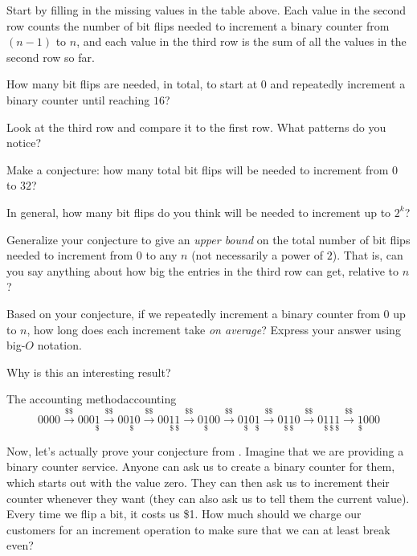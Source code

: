 \documentclass{tufte-handout}
\begin{document}
\begin{questions}
\item Start by filling in the missing values in the table above. Each
  value in the second row counts the number of bit flips needed to
  increment a binary counter from $(n-1)$ to $n$, and each value in
  the third row is the sum of all the values in the second row so far.
  \item How many bit flips are needed, in total, to start at $0$ and
    repeatedly increment a binary counter until reaching $16$?
  \item Look at the third row and compare it to the first row.  What
    patterns do you notice?
  \item Make a conjecture: how many total bit flips will be needed to
    increment from $0$ to $32$?
  \item In general, how many bit flips do you think will be needed to
    increment up to $2^k$?
  \item \label{q:upper-bound} Generalize your conjecture to give an
    \emph{upper bound} on the total number of bit flips needed to
    increment from $0$ to any $n$ (not necessarily a power of $2$).
    That is, can you say anything about how big the entries in the
    third row can get, relative to $n$?
  \item Based on your conjecture, if we repeatedly increment a binary
    counter from $0$ up to $n$, how long does each increment take
    \emph{on average}?  Express your answer using big-$O$ notation.
  \item Why is this an interesting result?
\end{questions}

\pause

\newcommand{\one}{\underset{\$}{1}}
\newcommand{\pay}{\overset{\$\$}{\longrightarrow}}

\begin{model*}{The accounting method}{accounting}
  \[ 0000 \pay 000\one \pay 00\one 0 \pay 00\one\one \pay 0 \one 00 \pay
     0\one 0\one \pay 0\one \one 0 \pay 0 \one\one\one \pay \one 000
  \]
\end{model*}

Now, let's actually prove your conjecture from .
Imagine that we are providing a binary counter
service.  Anyone can ask us to create a
binary counter for them, which starts out with the value zero. They
can then ask us to increment their counter whenever they want (they
can also ask us to tell them the current value).  Every time we flip a
bit, it costs us \$1.  How much should we charge our customers for an
increment operation to make sure that we can at least break even?
\end{document}
